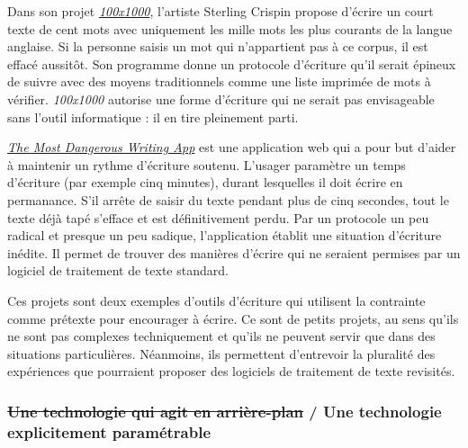 \documentclass[]{article}
\begin{document}
Dans son projet \href{http://www.100x1000.net/}{\emph{100x1000}},
l'artiste Sterling Crispin propose d'écrire un court texte de cent mots
avec uniquement les mille mots les plus courants de la langue anglaise.
Si la personne saisis un mot qui n'appartient pas à ce corpus, il est
effacé aussitôt. Son programme donne un protocole d'écriture qu'il
serait épineux de suivre avec des moyens traditionnels comme une liste
imprimée de mots à vérifier. \emph{100x1000} autorise une forme
d'écriture qui ne serait pas envisageable sans l'outil informatique : il
en tire pleinement parti.

\href{http://www.themostdangerouswritingapp.com/}{\emph{The Most
Dangerous Writing App}} est une application web qui a pour but d'aider à
maintenir un rythme d'écriture soutenu. L'usager paramètre un temps
d'écriture (par exemple cinq minutes), durant lesquelles il doit écrire
en permanance. S'il arrête de saisir du texte pendant plus de cinq
secondes, tout le texte déjà tapé s'efface et est définitivement perdu.
Par un protocole un peu radical et presque un peu sadique, l'application
établit une situation d'écriture inédite. Il permet de trouver des
manières d'écrire qui ne seraient permises par un logiciel de traitement
de texte standard.

Ces projets sont deux exemples d'outils d'écriture qui utilisent la
contrainte comme prétexte pour encourager à écrire. Ce sont de petits
projets, au sens qu'ils ne sont pas complexes techniquement et qu'ils ne
peuvent servir que dans des situations particulières. Néanmoins, ils
permettent d'entrevoir la pluralité des expériences que pourraient
proposer des logiciels de traitement de texte revisités.

\newpage

\hypertarget{une-technologie-qui-agit-en-arriuxe8re-plan-une-technologie-explicitement-paramuxe9trable}{%
\subsubsection{\texorpdfstring{\sout{Une technologie qui agit en
arrière-plan} / Une technologie explicitement
paramétrable}{Une technologie qui agit en arrière-plan / Une technologie explicitement paramétrable}}\label{une-technologie-qui-agit-en-arriuxe8re-plan-une-technologie-explicitement-paramuxe9trable}}
\end{document}
